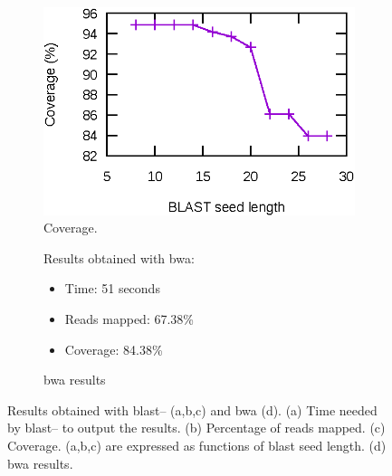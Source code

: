 \begin{figure}
    \begin{subfigure}[b]{0.5\textwidth}
        \includegraphics{img/coverage}
        \caption{Coverage.}\label{fig:coverage}
    \end{subfigure}
    \hfill
    \begin{subfigure}[b]{0.5\textwidth}
        \begin{flushright}
        \begin{minipage}[b]{0.75\textwidth}
        Results obtained with \gls{bwa}:
        \vspace{1.5ex}
        \begin{itemize}
            \item Time: 51 seconds
            \vspace{1.5ex}
            \item Reads mapped: 67.38\%
            \vspace{1.5ex}
            \item Coverage: 84.38\%
            \vspace{1.5ex}
        \end{itemize}
        \end{minipage}
        \end{flushright}
        \vspace{1.5cm}
        \caption{\acrshort{bwa} results}\label{fig:bwaResults}
    \end{subfigure}
    \caption[Results obtained with \acrshort{blast}--\blastobam{} and \acrshort{bwa}]{Results obtained with \acrshort{blast}--\blastobam{} (a,b,c) and \acrshort{bwa} (d).
    (a) Time needed by \acrshort{blast}--\blastobam{} to output the results. (b) Percentage of reads mapped. (c) Coverage. (a,b,c) are expressed as functions of \acrshort{blast} seed length.
    (d) \acrshort{bwa} results.}\label{fig:results}
\end{figure}

